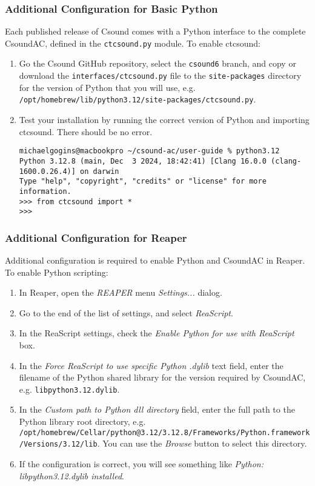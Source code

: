 \documentclass[letterpaper,10pt,DIV=12]{scrartcl}
\begin{document}
\subsubsection{Additional Configuration for Basic Python}

Each published release of Csound comes with a Python interface to the complete CsoundAC, defined in the \lstinline|ctcsound.py| module. To enable ctcsound:

\begin{enumerate}
\item Go the Csound GitHub repository, select the \lstinline|csound6| branch, and copy or download the \lstinline|interfaces/ctcsound.py| file to the \lstinline|site-packages| directory for the version of Python that you will use, e.g. \lstinline|/opt/homebrew/lib/python3.12/site-packages/ctcsound.py|.
\item Test your installation by running the correct version of Python and importing ctcsound. There should be no error.

\begin{lstlisting}[basicstyle=\small\ttfamily]
michaelgogins@macbookpro ~/csound-ac/user-guide % python3.12
Python 3.12.8 (main, Dec  3 2024, 18:42:41) [Clang 16.0.0 (clang-1600.0.26.4)] on darwin
Type "help", "copyright", "credits" or "license" for more information.
>>> from ctcsound import *
>>> 
\end{lstlisting}

\end{enumerate}

\subsubsection{Additional Configuration for Reaper}

Additional configuration is required to enable Python and CsoundAC in Reaper. To enable Python scripting:

\begin{enumerate}
\item In Reaper, open the \emph{REAPER} menu \emph{Settings...} dialog.
\item Go to the end of the list of settings, and select \emph{ReaScript}.
\item In the ReaScript settings, check the \emph{Enable Python for use with ReaScript} box.
\item In the \emph{Force ReaScript to use specific Python .dylib} text field, enter the filename of the Python shared library for the version required by CsoundAC, e.g. \lstinline|libpython3.12.dylib|. 
\item In the \emph{Custom path to Python dll directory} field, enter the full path to the Python library root directory, e.g. \lstinline|/opt/homebrew/Cellar/python@3.12/3.12.8/Frameworks/Python.framework/Versions/3.12/lib|. You can use the \emph{Browse} button to select this directory.
\item If the configuration is correct, you will see something like \emph{Python: libpython3.12.dylib installed}.
\end{enumerate}
\end{document}
